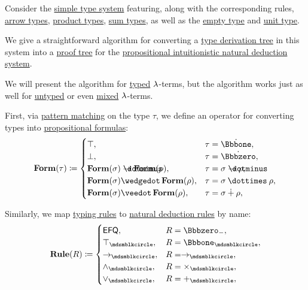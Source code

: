 \begin{algorithm}\label{alg:type_derivation_to_proof_tree}
  Consider the \hyperref[def:simple_type_system]{simple type system} featuring, along with the corresponding rules, \hyperref[def:simple_type]{arrow types}, \hyperref[def:product_type]{product types}, \hyperref[def:product_type]{sum types}, as well as the \hyperref[def:empty_type]{empty type} and \hyperref[def:unit_type]{unit type}.

  We give a straightforward algorithm for converting a \hyperref[def:type_derivation_tree]{type derivation tree} in this system into a \hyperref[def:natural_deduction_proof_tree]{proof tree} for the \hyperref[def:propositional_natural_deduction_systems]{propositional intuitionistic natural deduction system}.

  We will present the algorithm for \hyperref[def:typed_lambda_term]{typed} \( \mathrm{\lambda} \)-terms, but the algorithm works just as well for \hyperref[def:lambda_term]{untyped} or even \hyperref[rem:mixed_lambda_term]{mixed} \( \mathrm{\lambda} \)-terms.

  \begin{thmenum}
     First, via \hyperref[con:evaluation]{pattern matching} on the type \( \tau \), we define an operator for converting types into \hyperref[def:propositional_syntax/formula]{propositional formulas}:
    \begin{equation*}
      \op*{Form}(\tau) \coloneqq \begin{cases}
        \top,                                            &\tau = \syn\Bbbone, \\
        \bot,                                            &\tau = \syn\Bbbzero, \\
        \op*{Form}(\sigma) \synimplies \op*{Form}(\rho), &\tau = \sigma \synimplies \rho, \\
        \op*{Form}(\sigma) \synwedge \op*{Form}(\rho),   &\tau = \sigma \syntimes \rho, \\
        \op*{Form}(\sigma) \synvee \op*{Form}(\rho),     &\tau = \sigma \synplus \rho, \\
      \end{cases}
    \end{equation*}

     Similarly, we map \hyperref[def:simple_typing_rule]{typing rules} to \hyperref[def:natural_deduction_rule]{natural deduction rules} by name:
    \begin{equation*}
      \op*{Rule}(R) \coloneqq \begin{cases}
        \logic{EFQ},         &R = \Bbbzero_-, \\
        \top_{\Anon},        &R = \Bbbone_{\Anon}, \\
        \rightarrow_{\Anon}, &R = \rightarrow_{\Anon}, \\
        \wedge_{\Anon},      &R = \times_{\Anon}, \\
        \vee_{\Anon},        &R = +_{\Anon}, \\
      \end{cases}
    \end{equation*}


\end{thmenum}
\end{algorithm}
